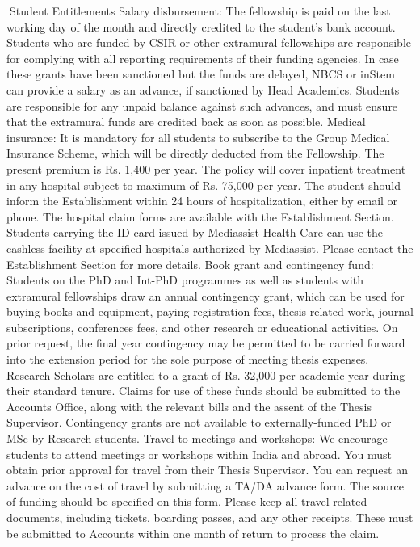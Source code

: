 \documentclass[a4paper,10pt]{article}
\begin{document}
Student Entitlements
Salary disbursement: The fellowship is paid on the last working day of the month and
directly credited to the student’s bank account. Students who are funded by CSIR or other
extramural fellowships are responsible for complying with all reporting requirements of
their funding agencies. In case these grants have been sanctioned but the funds are delayed,
NBCS or inStem can provide a salary as an advance, if sanctioned by Head Academics.
Students are responsible for any unpaid balance against such advances, and must ensure that
the extramural funds are credited back as soon as possible.
Medical insurance: It is mandatory for all students to subscribe to the Group Medical
Insurance Scheme, which will be directly deducted from the Fellowship. The present
premium is Rs. 1,400 per year. The policy will cover inpatient treatment in any hospital
subject to maximum of Rs. 75,000 per year. The student should inform the Establishment
within 24 hours of hospitalization, either by email or phone. The hospital claim forms are
available with the Establishment Section. Students carrying the ID card issued by Mediassist
Health Care can use the cashless facility at specified hospitals authorized by Mediassist.
Please contact the Establishment Section for more details.
Book grant and contingency fund: Students on the PhD and Int-PhD programmes as well
as students with extramural fellowships draw an annual contingency grant, which can be
used for buying books and equipment, paying registration fees, thesis-related work, journal
subscriptions, conferences fees, and other research or educational activities. On prior
request, the final year contingency may be permitted to be carried forward into the extension
period for the sole purpose of meeting thesis expenses. Research Scholars are entitled to a
grant of Rs. 32,000 per academic year during their standard tenure. Claims for use of these
funds should be submitted to the Accounts Office, along with the relevant bills and the
assent of the Thesis Supervisor. Contingency grants are not available to externally-funded
PhD or MSc-by Research students.
Travel to meetings and workshops: We encourage students to attend meetings or
workshops within India and abroad. You must obtain prior approval for travel from their
Thesis Supervisor. You can request an advance on the cost of travel by submitting a TA/DA
advance form. The source of funding should be specified on this form. Please keep all
travel-related documents, including tickets, boarding passes, and any other receipts. These
must be submitted to Accounts within one month of return to process the claim.
\end{document}

